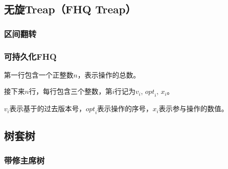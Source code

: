 \documentclass{article}
\begin{document}



% 
\subsection{无旋Treap（FHQ Treap）}
\subsubsection{区间翻转}


\subsubsection{可持久化FHQ}
第一行包含一个正整数$n$，表示操作的总数。\par
接下来$n$行，每行包含三个整数，第$i$行记为${v}_{i}$, ${opt}_i$, $x_i$。\par
$v_i$表示基于的过去版本号，${opt}_i$表示操作的序号，$x_i$表示参与操作的数值。



\subsection{树套树}
\subsubsection{带修主席树}

\end{document}
